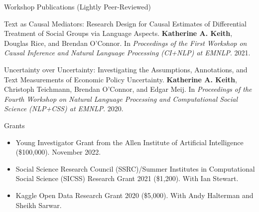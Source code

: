 \documentclass{resume} %
\begin{document}
\begin{rSection}{Workshop Publications (Lightly Peer-Reviewed)}
\begin{etaremune}
\item Text as Causal Mediators: Research Design for Causal Estimates of Differential Treatment of Social Groups via Language Aspects. \textbf{Katherine A. Keith}, Douglas Rice, and Brendan O'Connor. In \emph{Proceedings of the First Workshop on Causal Inference and Natural Language Processing (CI+NLP) at EMNLP}. 2021.  

\item Uncertainty over Uncertainty: Investigating the Assumptions, Annotations, and Text Measurements of Economic Policy Uncertainty. \textbf{Katherine A. Keith}, Christoph Teichmann, Brendan O’Connor, and Edgar Meij.  In \emph{Proceedings of the Fourth Workshop on Natural Language Processing and Computational Social Science (NLP+CSS) at EMNLP}. 2020.

\end{etaremune}
\end{rSection}

\begin{rSection}{Grants}
\begin{itemize}
\item Young Investigator Grant from the Allen Institute of Artificial Intelligence (\$100,000). November 2022. 
\item  Social Science Research Council (SSRC)/Summer Institutes in Computational Social Science (SICSS) Research Grant 2021 (\$1,200). With Ian Stewart. 
\item  Kaggle Open Data Research Grant 2020 (\$5,000). With Andy Halterman and Sheikh Sarwar.
\end{itemize}

\end{rSection}



\end{document}
